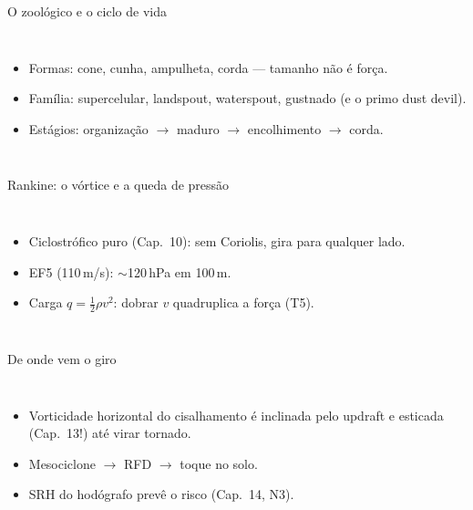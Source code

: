 \documentclass[aspectratio=169,11pt]{beamer}
\begin{document}
\begin{frame}{O zoológico e o ciclo de vida}
  \begin{columns}
    \begin{itemize}
      \item Formas: cone, cunha, ampulheta, corda — tamanho não é
            força.
      \item Família: supercelular, landspout, waterspout, gustnado
            (e o primo dust devil).
      \item Estágios: organização $\to$ maduro $\to$ encolhimento
            $\to$ corda.
    \end{itemize}
  \end{columns}
\end{frame}

\begin{frame}{Rankine: o vórtice e a queda de pressão}
  \begin{columns}
    \vspace{0.4em}
    \begin{itemize}
      \item Ciclostrófico puro (Cap.~10): sem Coriolis, gira para
            qualquer lado.
      \item EF5 (110\,m/s): $\sim$120\,hPa em 100\,m.
      \item Carga $q = \tfrac12\rho v^2$: dobrar $v$ quadruplica a
            força (T5).
    \end{itemize}
  \end{columns}
\end{frame}

\begin{frame}{De onde vem o giro}
  \begin{columns}
    \begin{itemize}
      \item Vorticidade horizontal do cisalhamento é
            \alert{inclinada} pelo updraft e \alert{esticada}
            (Cap.~13!) até virar tornado.
      \item Mesociclone $\to$ RFD $\to$ toque no solo.
      \item SRH do hodógrafo prevê o risco (Cap.~14, N3).
    \end{itemize}
  \end{columns}
\end{frame}
\end{document}
